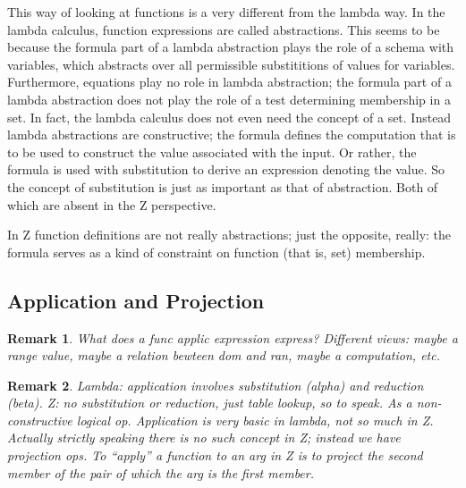 \documentclass[12pt]{tufte-handout}
\numberwithin{equation}{subsection}
\numberwithin{equation}{subsection}
\newtheorem{remark}{Remark}
\begin{document}
  This way of looking at functions is a very different from the lambda
  way.  In the lambda calculus, function expressions are called
  abstractions.  This seems to be because the formula part of a lambda
  abstraction plays the role of a schema with variables, which
  abstracts over all permissible substititions of values for
  variables.  Furthermore, equations play no role in lambda
  abstraction; the formula part of a lambda abstraction does not play
  the role of a test determining membership in a set.  In fact, the
  lambda calculus does not even need the concept of a
  set.  Instead lambda abstractions are constructive; the formula
  defines the computation that is to be used to construct the value
  associated with the input.  Or rather, the formula is used with
  substitution to derive an expression denoting the value.  So the
  concept of substitution is just as important as that of abstraction.
  Both of which are absent in the Z perspective.

  In Z function definitions are not really abstractions; just the
  opposite, really: the formula serves as a kind of constraint on
  function (that is, set) membership.

  \subsection{Application and Projection}
  \label{subs:}

  \begin{remark}
    What does a func applic expression express?  Different views:
    maybe a range value, maybe a relation bewteen dom and ran, maybe a
    computation, etc.
  \end{remark}

  \begin{remark}
    Lambda: application involves substitution (alpha) and reduction
    (beta).  Z: no substitution or reduction, just table lookup, so to
    speak.  As a non-constructive logical op.  Application is very
    basic in lambda, not so much in Z.  Actually strictly speaking
    there is no such concept in Z; instead we have projection ops.  To
    ``apply'' a function to an arg in Z is to project the second
    member of the pair of which the arg is the first member.
  \end{remark}
\end{document}
